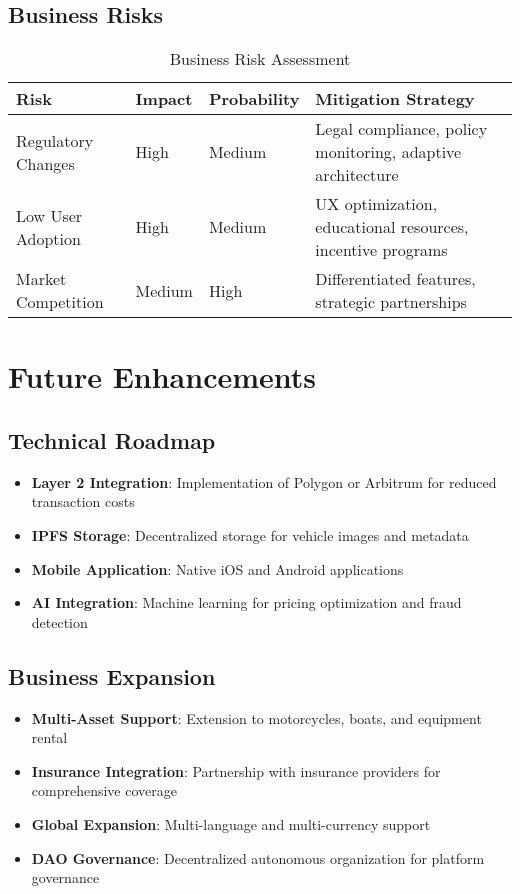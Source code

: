 \documentclass[12pt,a4paper]{article}
\begin{document}
\subsection{Business Risks}

\begin{table}[H]
\centering
\begin{tabular}{|p{3cm}|p{2cm}|p{2cm}|p{6cm}|}
\hline
\textbf{Risk} & \textbf{Impact} & \textbf{Probability} & \textbf{Mitigation Strategy} \\
\hline
Regulatory Changes & High & Medium & Legal compliance, policy monitoring, adaptive architecture \\
\hline
Low User Adoption & High & Medium & UX optimization, educational resources, incentive programs \\
\hline
Market Competition & Medium & High & Differentiated features, strategic partnerships \\
\hline
\end{tabular}
\caption{Business Risk Assessment}
\end{table}

\section{Future Enhancements}

\subsection{Technical Roadmap}
\begin{itemize}
    \item \textbf{Layer 2 Integration}: Implementation of Polygon or Arbitrum for reduced transaction costs
    \item \textbf{IPFS Storage}: Decentralized storage for vehicle images and metadata
    \item \textbf{Mobile Application}: Native iOS and Android applications
    \item \textbf{AI Integration}: Machine learning for pricing optimization and fraud detection
\end{itemize}

\subsection{Business Expansion}
\begin{itemize}
    \item \textbf{Multi-Asset Support}: Extension to motorcycles, boats, and equipment rental
    \item \textbf{Insurance Integration}: Partnership with insurance providers for comprehensive coverage
    \item \textbf{Global Expansion}: Multi-language and multi-currency support
    \item \textbf{DAO Governance}: Decentralized autonomous organization for platform governance
\end{itemize}
\end{document}
